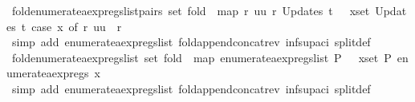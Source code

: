 \begin{isabellebody}
\endisatagproof
{\isafoldproof}%
%
\isadelimproof
\isanewline
%
\endisadelimproof
\isanewline
{}\isamarkupfalse%
\ fold{\isacharunderscore}enumerate{\isacharunderscore}aexp{\isacharunderscore}regs{\isacharunderscore}list{\isacharunderscore}pairs{\isacharunderscore}{}{\isacharcolon}\ {\isachardoublequoteopen}set\ {\isacharparenleft}fold\ {\isacharparenleft}{\isacharat}{\isacharparenright}\ {\isacharparenleft}map\ {\isacharparenleft}{\isasymlambda}{\isacharparenleft}r{\isacharcomma}\ uu{\isacharparenright}{\isachardot}\ {\isacharbrackleft}r{\isacharbrackright}{\isacharparenright}\ {\isacharparenleft}Updates\ t{\isacharparenright}{\isacharparenright}\ {\isacharbrackleft}{\isacharbrackright}{\isacharparenright}\ {\isacharequal}\ {\isacharparenleft}{\isasymUnion}x{\isasymin}set\ {\isacharparenleft}Updates\ t{\isacharparenright}{\isachardot}\ case\ x\ of\ {\isacharparenleft}r{\isacharcomma}\ uu{\isacharparenright}\ {\isasymRightarrow}\ {\isacharbraceleft}r{\isacharbraceright}{\isacharparenright}{\isachardoublequoteclose}\isanewline
%
\isadelimproof
\ \ \ \ %
\endisadelimproof
%
\isatagproof
{}\isamarkupfalse%
\ {\isacharparenleft}simp\ add{\isacharcolon}\ enumerate{\isacharunderscore}aexp{\isacharunderscore}regs{\isacharunderscore}list\ fold{\isacharunderscore}append{\isacharunderscore}concat{\isacharunderscore}rev\ inf{\isacharunderscore}sup{\isacharunderscore}aci{\isacharparenleft}{}{\isacharparenright}\ split{\isacharunderscore}def{\isacharparenright}%
\endisatagproof
{\isafoldproof}%
%
\isadelimproof
\isanewline
%
\endisadelimproof
\isanewline
{}\isamarkupfalse%
\ fold{\isacharunderscore}enumerate{\isacharunderscore}aexp{\isacharunderscore}regs{\isacharunderscore}list{\isacharcolon}\ {\isachardoublequoteopen}set\ {\isacharparenleft}fold\ {\isacharparenleft}{\isacharat}{\isacharparenright}\ {\isacharparenleft}map\ enumerate{\isacharunderscore}aexp{\isacharunderscore}regs{\isacharunderscore}list\ P{\isacharparenright}\ {\isacharbrackleft}{\isacharbrackright}{\isacharparenright}\ {\isacharequal}\ {\isacharparenleft}{\isasymUnion}x{\isasymin}set\ P{\isachardot}\ enumerate{\isacharunderscore}aexp{\isacharunderscore}regs\ x{\isacharparenright}{\isachardoublequoteclose}\isanewline
%
\isadelimproof
\ \ \ \ %
\endisadelimproof
%
\isatagproof
{}\isamarkupfalse%
\ {\isacharparenleft}simp\ add{\isacharcolon}\ enumerate{\isacharunderscore}aexp{\isacharunderscore}regs{\isacharunderscore}list\ fold{\isacharunderscore}append{\isacharunderscore}concat{\isacharunderscore}rev\ inf{\isacharunderscore}sup{\isacharunderscore}aci{\isacharparenleft}{}{\isacharparenright}\ split{\isacharunderscore}def{\isacharparenright}%

\end{isabellebody}
